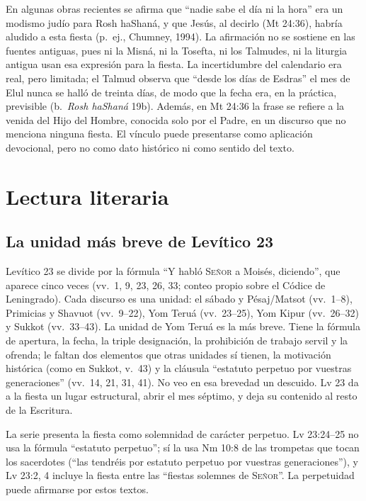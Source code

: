 \documentclass[11pt,letterpaper]{article}
\newcommand{\SENOR}{\textsc{Señor}}
\begin{document}
\begin{nota}
En algunas obras recientes se afirma que ``nadie sabe el día ni la hora'' era un modismo judío para Rosh haShaná, y que Jesús, al decirlo (Mt 24:36), habría aludido a esta fiesta (p.~ej., Chumney, 1994). La afirmación no se sostiene en las fuentes antiguas, pues ni la Misná, ni la Tosefta, ni los Talmudes, ni la liturgia antigua usan esa expresión para la fiesta. La incertidumbre del calendario era real, pero limitada; el Talmud observa que ``desde los días de Esdras'' el mes de Elul nunca se halló de treinta días, de modo que la fecha era, en la práctica, previsible (b.~\emph{Rosh haShaná} 19b). Además, en Mt 24:36 la frase se refiere a la venida del Hijo del Hombre, conocida solo por el Padre, en un discurso que no menciona ninguna fiesta. El vínculo puede presentarse como aplicación devocional, pero no como dato histórico ni como sentido del texto.
\end{nota}


\section{Lectura literaria}

\subsection{La unidad más breve de Levítico 23}
Levítico 23 se divide por la fórmula ``Y habló \SENOR{} a Moisés, diciendo'', que aparece cinco veces (vv.~1, 9, 23, 26, 33; conteo propio sobre el Códice de Leningrado). Cada discurso es una unidad: el sábado y Pésaj/Matsot (vv.~1--8), Primicias y Shavuot (vv.~9--22), Yom Teruá (vv.~23--25), Yom Kipur (vv.~26--32) y Sukkot (vv.~33--43). La unidad de Yom Teruá es la más breve. Tiene la fórmula de apertura, la fecha, la triple designación, la prohibición de trabajo servil y la ofrenda; le faltan dos elementos que otras unidades sí tienen, la motivación histórica (como en Sukkot, v.~43) y la cláusula ``estatuto perpetuo por vuestras generaciones'' (vv.~14, 21, 31, 41). No veo en esa brevedad un descuido. Lv 23 da a la fiesta un lugar estructural, abrir el mes séptimo, y deja su contenido al resto de la Escritura.

\begin{nota}[Precisión]
La serie presenta la fiesta como solemnidad de carácter perpetuo. Lv 23:24--25 no usa la fórmula ``estatuto perpetuo''; sí la usa Nm 10:8 de las trompetas que tocan los sacerdotes (``las tendréis por estatuto perpetuo por vuestras generaciones''), y Lv 23:2, 4 incluye la fiesta entre las ``fiestas solemnes de \SENOR''. La perpetuidad puede afirmarse por estos textos.
\end{nota}
\end{document}
